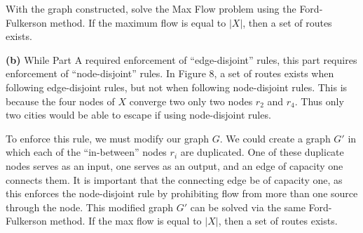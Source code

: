 \documentclass[11pt]{article}
\renewcommand\part[1]{\vspace{.10in}\textbf{(#1)}}
\begin{document}
With the graph constructed, solve the Max Flow problem using the Ford-Fulkerson method. If the maximum flow is equal to $\lvert X \rvert$, then a set of routes exists.

\part{b}
While Part A required enforcement of ``edge-disjoint'' rules, this part requires enforcement of ``node-disjoint'' rules. In Figure 8, a set of routes exists when following edge-disjoint rules, but not when following node-disjoint rules. This is because the four nodes of $X$ converge two only two nodes $r_2$ and $r_4$. Thus only two cities would be able to escape if using node-disjoint rules.

To enforce this rule, we must modify our graph $G$. We could create a graph $G'$ in which each of the ``in-between'' nodes $r_i$ are duplicated. One of these duplicate nodes serves as an input, one serves as an output, and an edge of capacity one connects them. It is important that the connecting edge be of capacity one, as this enforces the node-disjoint rule by prohibiting flow from more than one source through the node. This modified graph $G'$ can be solved via the same Ford-Fulkerson method. If the max flow is equal to $\lvert X \rvert$, then a set of routes exists.
\end{document}
